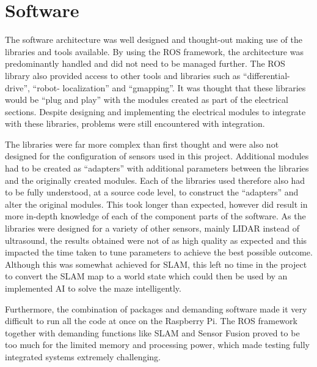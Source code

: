 \section{Software}\label{eval/soft}
The software architecture was well designed and thought-out making use of the
libraries and tools available. By using the ROS framework, the architecture was predominantly handled
and did not need to be managed further. The ROS library also provided
access to other tools and libraries such as ``differential-drive'', ``robot-
localization'' and ``gmapping''. It was thought that these libraries would be ``plug
and play'' with the modules created as part of the electrical sections. Despite
designing and implementing the electrical modules to integrate with these libraries,
problems were still encountered with integration.

The libraries were far more complex than first thought and were also not designed for
the configuration of sensors used in this project. Additional modules had to be
created as ``adapters'' with additional parameters between the libraries and the
originally created modules. Each of the libraries used therefore also had to be fully
understood, at a source code level, to construct the ``adapters'' and alter
the original modules. This took longer than expected, however did result in more in-depth knowledge of each of the component parts of the software. As the libraries were
designed for a variety of other sensors, mainly LIDAR instead of ultrasound, the
results obtained were not of as high quality as expected and this impacted the time
taken to tune parameters to achieve the best possible outcome. Although this was
somewhat achieved for SLAM, this left no time in the project to convert the SLAM map
to a world state which could then be used by an implemented AI to solve the maze
intelligently.

Furthermore, the combination of packages and demanding software made it very difficult to run all the code at once on the Raspberry Pi. The ROS framework together with demanding functions like SLAM and Sensor Fusion proved to be too much for the limited memory and processing power, which made testing fully integrated systems extremely challenging.
